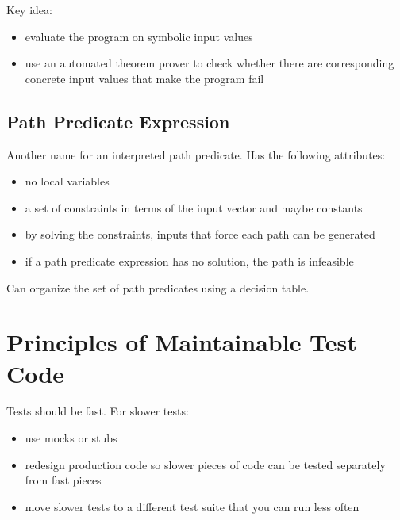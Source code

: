 \documentclass[11pt]{article}
\begin{document}
Key idea:
\begin{itemize}
\item evaluate the program on symbolic input values
\item use an automated theorem prover to check whether
there are corresponding concrete input values that
make the program fail
\end{itemize}
\subsection{Path Predicate Expression}
\label{sec:org6ff7f3c}
Another name for an interpreted path predicate.
Has the following attributes:
\begin{itemize}
\item no local variables
\item a set of constraints in terms of the input vector
and maybe constants
\item by solving the constraints, inputs that force each
path can be generated
\item if a path predicate expression has no solution,
the path is infeasible
\end{itemize}

Can organize the set of path predicates using
a decision table.
\section{Principles of Maintainable Test Code}
\label{sec:org01109c5}
Tests should be fast. For slower tests:
\begin{itemize}
\item use mocks or stubs
\item redesign production code so slower pieces of code
can be tested separately from fast pieces
\item move slower tests to a different test suite that you
can run less often
\end{itemize}
\end{document}
